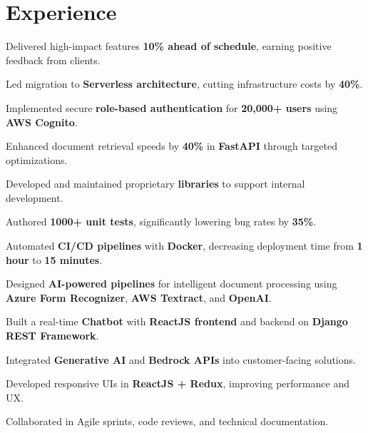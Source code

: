 \documentclass[]{deedy-resume-reversed}
\begin{document}
\begin{minipage}[t]{0.60\textwidth}

\section{Experience}

\vspace{\topsep}
\begin{tightemize}
\item Delivered high-impact features \textbf{10\% ahead of schedule}, earning positive feedback from clients.
\item Led migration to \textbf{Serverless architecture}, cutting infrastructure costs by \textbf{40\%}.
\item Implemented secure \textbf{role-based authentication} for \textbf{20,000+ users} using \textbf{AWS Cognito}.
\item Enhanced document retrieval speeds by \textbf{40\%} in \textbf{FastAPI} through targeted optimizations.
\item Developed and maintained proprietary \textbf{libraries} to support internal development.
\item Authored \textbf{1000+ unit tests}, significantly lowering bug rates by \textbf{35\%}.
\item Automated \textbf{CI/CD pipelines} with \textbf{Docker}, decreasing deployment time from \textbf{1 hour} to \textbf{15 minutes}.
\end{tightemize}

\begin{tightemize}
\item Designed \textbf{AI-powered pipelines} for intelligent document processing using \textbf{Azure Form Recognizer}, \textbf{AWS Textract}, and \textbf{OpenAI}.
\item Built a real-time \textbf{Chatbot} with \textbf{ReactJS frontend} and backend on \textbf{Django REST Framework}.
\item Integrated \textbf{Generative AI} and \textbf{Bedrock APIs} into customer-facing solutions.
\item Developed responsive UIs in \textbf{ReactJS + Redux}, improving performance and UX.
\item Collaborated in Agile sprints, code reviews, and technical documentation.
\end{tightemize}
\sectionsep


\end{minipage}
\end{document}
